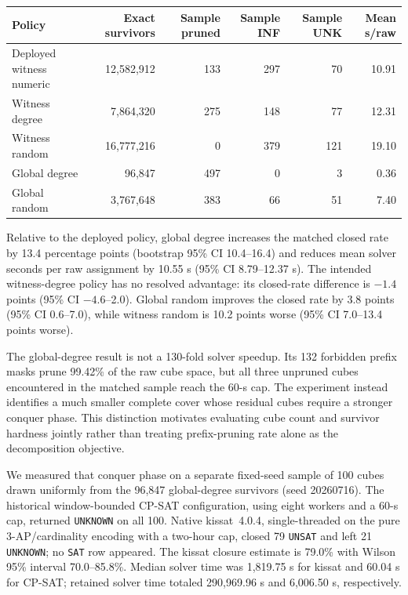 {\small\setlength{\tabcolsep}{4pt}
\begin{longtable}[]{@{}lrrrrr@{}}
\toprule\noalign{}
Policy & Exact survivors & Sample pruned & Sample INF & Sample UNK & Mean s/raw \\
\midrule\noalign{}
\endhead
\bottomrule\noalign{}
\endlastfoot
Deployed witness numeric & 12,582,912 & 133 & 297 & 70 & 10.91 \\
Witness degree & 7,864,320 & 275 & 148 & 77 & 12.31 \\
Witness random & 16,777,216 & 0 & 379 & 121 & 19.10 \\
Global degree & 96,847 & 497 & 0 & 3 & 0.36 \\
Global random & 3,767,648 & 383 & 66 & 51 & 7.40 \\
\end{longtable}
}

Relative to the deployed policy, global degree increases the matched closed
rate by 13.4 percentage points (bootstrap 95\% CI 10.4--16.4) and reduces mean
solver seconds per raw assignment by 10.55 s (95\% CI 8.79--12.37 s). The
intended witness-degree policy has no resolved advantage: its closed-rate
difference is $-1.4$ points (95\% CI $-4.6$--2.0). Global random improves the
closed rate by 3.8 points (95\% CI 0.6--7.0), while witness random is 10.2
points worse (95\% CI 7.0--13.4 points worse).

The global-degree result is not a 130-fold solver speedup. Its 132 forbidden
prefix masks prune 99.42\% of the raw cube space, but all three unpruned cubes
encountered in the matched sample reach the 60-s cap. The experiment instead
identifies a much smaller complete cover whose residual cubes require a
stronger conquer phase. This distinction motivates evaluating cube count and
survivor hardness jointly rather than treating prefix-pruning rate alone as
the decomposition objective.

We measured that conquer phase on a separate fixed-seed sample of 100 cubes
drawn uniformly from the 96,847 global-degree survivors (seed 20260716). The
historical window-bounded CP-SAT configuration, using eight workers and a
60-s cap, returned \texttt{UNKNOWN} on all 100. Native kissat~4.0.4,
single-threaded on the pure 3-AP/cardinality encoding with a two-hour cap,
closed 79 \texttt{UNSAT} and left 21 \texttt{UNKNOWN}; no \texttt{SAT} row
appeared. The kissat closure estimate is 79.0\% with Wilson 95\% interval
70.0--85.8\%. Median solver time was 1,819.75 s for kissat and 60.04 s for
CP-SAT; retained solver time totaled 290,969.96 s and 6,006.50 s,
respectively.

